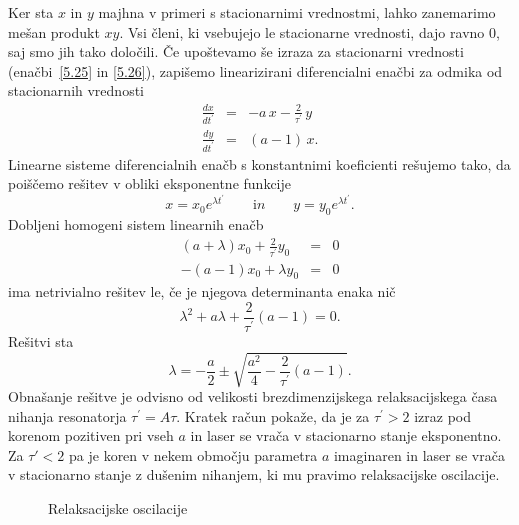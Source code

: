 Ker sta $x$ in $y$ majhna v primeri s stacionarnimi vrednostmi, lahko
zanemarimo mešan produkt $xy$. Vsi členi, ki vsebujejo le stacionarne vrednosti,
dajo ravno 0, saj smo jih tako določili. Če upoštevamo še izraza 
za stacionarni vrednosti (enačbi~\ref {5.25} in \ref{5.26}), 
zapišemo linearizirani diferencialni enačbi za odmika od stacionarnih vrednosti 
\begin{eqnarray}
\frac{dx}{dt^{\prime }} &=&-a\,x-\frac{2}{\tau ^{\prime }}\,y  \label{5.28}
\\
\frac{dy}{dt^{\prime }} &=&(a-1)\,x.
\end{eqnarray}
Linearne sisteme diferencialnih enačb s konstantnimi
koeficienti rešujemo tako, da poiščemo rešitev v obliki eksponentne funkcije 
\begin{equation}
x=x_{0}e^{\lambda t^{\prime }} \qquad {\mathrm in } \qquad 
y=y_{0}e^{\lambda t^{\prime }}.
\label{5.29}
\end{equation}
Dobljeni homogeni sistem linearnih enačb 
\begin{eqnarray}
(a+\lambda )x_{0}+\frac{2}{\tau ^{\prime }}y_{0} &=&0  \label{5.30} \\
-(a-1)x_{0}+\lambda y_{0} &=&0
\end{eqnarray}
ima netrivialno rešitev le, če je njegova determinanta enaka nič
\begin{equation}
\lambda ^{2}+a\lambda +\frac{2}{\tau ^{\prime }}(a-1)=0.  
\label{5.301}
\end{equation}
Rešitvi sta 
\begin{equation}
\lambda =-\frac{a}{2}\pm \sqrt{\frac{a^{2}}{4}-\frac{2}{\tau ^{\prime }}(a-1)}.
\label{5.31}
\end{equation}
Obnašanje rešitve je odvisno od velikosti brezdimenzijskega relaksacijskega
časa nihanja resonatorja $\tau ^{\prime }=A\tau $. Kratek račun pokaže, da je 
za $\tau ^{\prime }>2$ izraz pod korenom pozitiven pri vseh $a$ in laser 
se vrača v stacionarno stanje eksponentno. Za $\tau' <2$ pa je koren v nekem območju
parametra $a$ imaginaren in laser se vrača v stacionarno stanje z
dušenim nihanjem, ki mu pravimo relaksacijske oscilacije.

\begin{figure}[h]
\centering
\def\svgwidth{90truemm} 
%
\caption{Relaksacijske oscilacije}
\label{fig:relax}
\end{figure}

